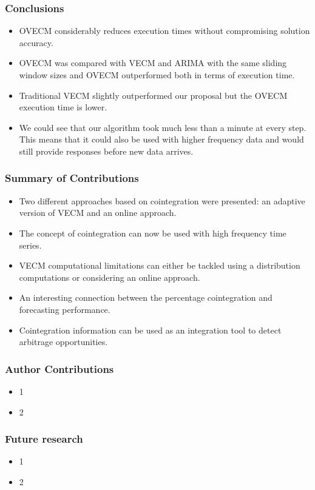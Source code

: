 \documentclass{beamer}
\begin{document}
\begin{frame}
\frametitle{Conclusions}
\begin{itemize}
\item  OVECM considerably reduces execution times
without compromising solution accuracy.  
\item OVECM was compared with VECM and ARIMA
with the same sliding window sizes and OVECM outperformed both in terms of
execution time. 
\item Traditional VECM slightly outperformed our proposal but the
OVECM execution time is lower.
\item We could see that our algorithm took much less than a minute at every
step. This means that it could also be used with higher frequency data and would
still provide responses before new data arrives.  
\end{itemize}
\end{frame}


\begin{frame}
\frametitle{Summary of Contributions}
\begin{itemize}
\item Two different approaches based on cointegration were presented: an adaptive version of VECM and an online approach.
\item The concept of cointegration can now be used with high frequency time series.
\item VECM computational limitations can either be tackled using a distribution computations or considering an online approach.
\item An interesting connection between the percentage cointegration and forecasting performance.
\item Cointegration information can be used as an integration tool to detect arbitrage opportunities.
\end{itemize}
\end{frame}

\begin{frame}
\frametitle{Author Contributions}
\begin{itemize}
\item 1
\item 2
\end{itemize}
\end{frame}


\begin{frame}
\frametitle{Future research}
\begin{itemize}
\item 1
\item 2
\end{itemize}
\end{frame}
\end{document}
